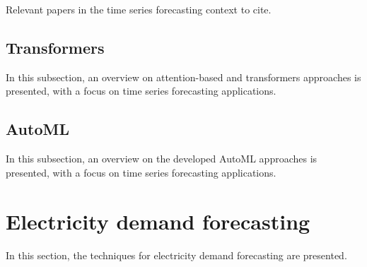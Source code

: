 Relevant papers in the time series forecasting context to cite.
\cite{DEGOOIJER2006443}
\cite{SMYL202075}
\cite{Lim2021}
\cite{ZHANG2003159}
\cite{Nesreen2010}
\cite{SEZER2020106181}
\cite{en16031371}
\cite{HEWAMALAGE2021388}
\cite{BENTAIEB20127067}
\cite{CAO2003321}
\cite{LI2019104785}
\cite{DU2020269}
\cite{Sean2017}
\cite{Masini2023}
\cite{Borovykh2017}
\cite{SHEN2020302}
\cite{DEOSANTOSJUNIOR201972}
\cite{Athiyarath2020}
\cite{Cerqueira2020}
\cite{6210391}
\cite{TEALAB2018334}
\cite{Oliveira2015}
\cite{BERGMEIR2012192}


\vspace{0.1 cm}
\subsection{Transformers}
\label{sec:transformers}
\vspace{0.1 cm}

In this subsection, an overview on attention-based and transformers approaches is presented, with a focus on time series forecasting applications.
\cite{Grigsby2021}
\cite{Wu2020}
\cite{Zhou2020}
\cite{Vaswani2017}
\cite{NIU202148}
\cite{LIM20211748}
\cite{LIU2020113082}
\cite{Shih2019}
\cite{WU2022123990}
\cite{ZHANG2022329}
\cite{9745215}
\cite{10019616}
\cite{9676694}
\cite{9892274}
\cite{9586824}
\cite{9688968}
\cite{HEIDARI2020626}


\vspace{0.1 cm}
\subsection{AutoML}
\label{sec:automl}
\vspace{0.1 cm}

In this subsection, an overview on the developed AutoML approaches is presented, with a focus on time series forecasting applications.
\cite{HE2021106622}
\cite{Gijsbers2019}
\cite{Feurer2020}
\cite{Zimmer2020}
\cite{Deng2022}
\cite{su142215292}
\cite{Karmaker2021}
\cite{Chen2021}
\cite{computers10010011}
\cite{Elshawi2019}
\cite{Feurer2015}
\cite{9534091}
\cite{9579526}
\cite{9660073}
\cite{8955514}
\cite{8995391}
\cite{9033810}
\cite{9564380}


\section{Electricity demand forecasting}
\label{sec:demandsoa}
\vspace{0.2 cm}

In this section, the techniques for electricity demand forecasting are presented.

